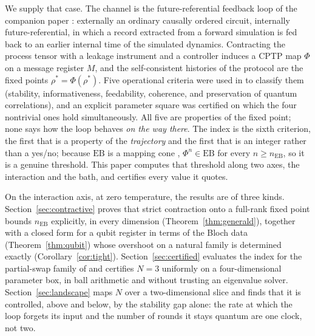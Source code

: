 \documentclass[11pt,a4paper]{article}
\theoremstyle{definition}
\theoremstyle{remark}
\newcommand{\nEB}{n_{\mathrm{EB}}}
\newcommand{\EB}{\mathrm{EB}}
\begin{document}
We supply that case. The channel is the future-referential feedback loop of
the companion paper \cite{PaperI}: externally an ordinary causally ordered
circuit, internally future-referential, in which a record extracted from a
forward simulation is fed back to an earlier internal time of the simulated
dynamics. Contracting the process tensor with a leakage instrument and a
controller induces a CPTP map $\Phi$ on a message register $M$, and the
self-consistent histories of the protocol are the fixed points
$\rho^{\ast}=\Phi(\rho^{\ast})$. Five operational criteria were used in
\cite{PaperI} to classify them (stability, informativeness, feedability,
coherence, and preservation of quantum correlations), and an explicit
parameter square was certified on which the four nontrivial ones hold
simultaneously. All five are properties of the fixed point; none says how the
loop behaves \emph{on the way there}. The index is the sixth criterion, the
first that is a property of the \emph{trajectory} and the first that is an
integer rather than a yes/no; because $\EB$ is a mapping cone
\cite{Stormer86}, $\Phi^{n}\in\EB$ for every $n\ge\nEB$, so it is a genuine
threshold. This paper computes that threshold along two axes, the interaction
and the bath, and certifies every value it quotes.

On the interaction axis, at zero temperature, the results are of three kinds.
Section~\ref{sec:contractive} proves that strict contraction onto a full-rank
fixed point bounds $\nEB$ explicitly, in every dimension
(Theorem~\ref{thm:generald}), together with a closed form for a qubit register
in terms of the Bloch data (Theorem~\ref{thm:qubit}) whose overshoot on a
natural family is determined exactly (Corollary~\ref{cor:tight}).
Section~\ref{sec:certified} evaluates the index for the partial-swap family of
\cite{PaperI} and certifies $N=3$ uniformly on a four-dimensional parameter
box, in ball arithmetic and without trusting an eigenvalue solver.
Section~\ref{sec:landscape} maps $N$ over a two-dimensional slice and finds
that it is controlled, above and below, by the stability gap alone: the rate
at which the loop forgets its input and the number of rounds it stays quantum
are one clock, not two.
\end{document}
